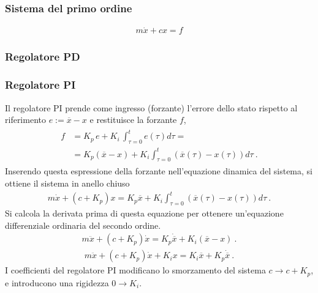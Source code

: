 \documentclass[letterpaper,10pt,italian]{jupyterBook}
\begin{document}
\subsubsection{Sistema del primo ordine}
\label{\detokenize{ch/control-intro:sistema-del-primo-ordine}}\label{\detokenize{ch/control-intro:id1}}\begin{equation*}
\begin{split}m \dot{x} + c x = f\end{split}
\end{equation*}\subsubsection*{Regolatore PD}
\subsubsection*{Regolatore PI}

\sphinxAtStartPar
Il regolatore PI prende come ingresso (forzante) l’errore dello stato rispetto al riferimento \(e := \overline{x} - x\) e restituisce la forzante \(f\),
\begin{equation*}
\begin{split}\begin{aligned}
  f & = K_p \, e + K_i \, \int_{\tau=0}^{t} e(\tau)d \tau = \\
    & = K_p ( \overline{x} - x ) + K_i \int_{\tau=0}^{t} \left( \overline{x}(\tau) - x(\tau) \right) d \tau \ .
\end{aligned}\end{split}
\end{equation*}
\sphinxAtStartPar
Inserendo questa espressione della forzante nell’equazione dinamica del sistema, si ottiene il sistema in anello chiuso
\begin{equation*}
\begin{split}m \dot{x} + ( c + K_p ) x = K_p \overline{x} + K_i \int_{\tau=0}^{t} \left( \overline{x}(\tau) - x(\tau) \right) d \tau \ .\end{split}
\end{equation*}
\sphinxAtStartPar
Si calcola la derivata prima di questa equazione per ottenere un’equazione differenziale ordinaria del secondo ordine.
\begin{equation*}
\begin{split}m \ddot{x} + \left( c + K_p \right) \dot{x} = K_p \dot{\overline{x}} + K_i \left( \overline{x} - x \right) \ . \end{split}
\end{equation*}\begin{equation*}
\begin{split}m \ddot{x} + \left( c + K_p \right) \dot{x} + K_i x = K_i \overline{x} + K_p \dot{\overline{x}} \ . \end{split}
\end{equation*}
\sphinxAtStartPar
{} I coefficienti del regolatore PI modificano lo smorzamento del sistema \(c \rightarrow c + K_p\), e introducono una rigidezza \(0 \rightarrow K_i\).
\end{document}
